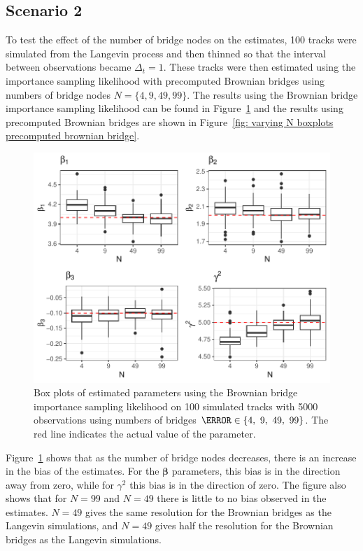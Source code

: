 \subsection{Scenario 2}
To test the effect of the number of bridge nodes on the estimates, 100 tracks were simulated from the Langevin process and then thinned so that the interval between observations became $\Delta_t =1$. These tracks were then estimated using the importance sampling likelihood with precomputed Brownian bridges using numbers of bridge nodes $N =\{4,9,49,99\}$. The results using the Brownian bridge importance sampling likelihood can be found in Figure~\ref{fig: varying N boxplots brownian bridge} and the results using precomputed Brownian bridges are shown in Figure~\ref{fig: varying N boxplots precomputed brownian bridge}. 

\begin{figure}[H]
    \centering
    \includegraphics[width=\linewidth]{Images/Results/varying N estimates BB.pdf}
    \caption[Box plots of Parameter Estimates using Brownian bridge importance sampling using different number of bridge nodes]{Box plots of estimated parameters using the Brownian bridge importance sampling likelihood on 100 simulated tracks with 5000 observations using numbers of bridges $\N \in \{4 , \ 9, \ 49, \ 99\}$. The red line indicates the actual value of the parameter.}
    \label{fig: varying N boxplots brownian bridge}
\end{figure}

Figure~\ref{fig: varying N boxplots brownian bridge} shows that as the number of bridge nodes decreases, there is an increase in the bias of the estimates. For the $\bm \beta$ parameters, this bias is in the direction away from zero, while for $\gamma^2$ this bias is in the direction of zero. The figure also shows that for $N=99$ and $N=49$ there is little to no bias observed in the estimates. $N = 49$ gives the same resolution for the Brownian bridges as the Langevin simulations, and $N=49$ gives half the resolution for the Brownian bridges as the Langevin simulations.

